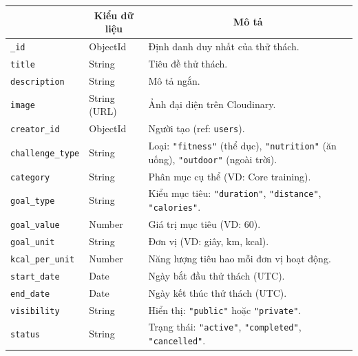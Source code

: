 \begin{table}[H]
\centering
\footnotesize
\setlength{\tabcolsep}{5pt}
\renewcommand{\arraystretch}{1.15}
\begin{tabularx}{\textwidth}{|p{3.6cm}|p{2.6cm}|X|}
\hline
\rowcolor{dbheadblue}
\multicolumn{1}{|c|}{\color{white}\textbf{Trường}} &
\multicolumn{1}{c|}{\color{white}\textbf{Kiểu dữ liệu}} &
\multicolumn{1}{c|}{\color{white}\textbf{Mô tả}} \\
\hline
\texttt{\_id}               & ObjectId      & Định danh duy nhất của thử thách. \\ \hline
\rowcolor{dbrowalt}
\texttt{title}             & String        & Tiêu đề thử thách. \\ \hline
\texttt{description}       & String        & Mô tả ngắn. \\ \hline
\rowcolor{dbrowalt}
\texttt{image}             & String (URL)  & Ảnh đại diện trên Cloudinary. \\ \hline
\texttt{creator\_id}        & ObjectId      & Người tạo (ref: \texttt{users}). \\ \hline
\rowcolor{dbrowalt}
\texttt{challenge\_type}    & String        & Loại: \texttt{"fitness"} (thể dục), \texttt{"nutrition"} (ăn uống), \texttt{"outdoor"} (ngoài trời). \\ \hline
\texttt{category}          & String        & Phân mục cụ thể (VD: Core training). \\ \hline
\rowcolor{dbrowalt}
\texttt{goal\_type}         & String        & Kiểu mục tiêu: \texttt{"duration"}, \texttt{"distance"}, \texttt{"calories"}. \\ \hline
\texttt{goal\_value}        & Number        & Giá trị mục tiêu (VD: 60). \\ \hline
\rowcolor{dbrowalt}
\texttt{goal\_unit}         & String        & Đơn vị (VD: giây, km, kcal). \\ \hline
\texttt{kcal\_per\_unit}     & Number        & Năng lượng tiêu hao mỗi đơn vị hoạt động. \\ \hline
\rowcolor{dbrowalt}
\texttt{start\_date}        & Date          & Ngày bắt đầu thử thách (UTC). \\ \hline
\texttt{end\_date}          & Date          & Ngày kết thúc thử thách (UTC). \\ \hline
\rowcolor{dbrowalt}
\texttt{visibility}        & String        & Hiển thị: \texttt{"public"} hoặc \texttt{"private"}. \\ \hline
\texttt{status}            & String        & Trạng thái: \texttt{"active"}, \texttt{"completed"}, \texttt{"cancelled"}. \\ \hline

\end{tabularx}
\end{table}
